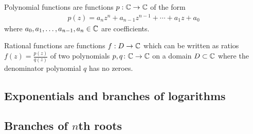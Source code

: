 \begin{definition}[Polynomial]
  \label{def:polynomial}
  Polynomial functions are functions $p : \mathbb{C} \to \mathbb{C}$ of the form
  \begin{align*}
    p(z) = a_n z^n + a_{n-1} z^{n-1} + \cdots + a_1 z + a_0
  \end{align*}
  where $a_0,a_1,\ldots,a_{n-1},a_n \in \mathbb{C}$ are coefficients.
\end{definition}

\begin{definition}
  \label{def:rational_function}
  Rational functions are functions $f : D \to \mathbb{C}$ which can be written as
  ratios $f(z) = \frac{p(z)}{q(z)}$ of two polynomials
  $p, q \colon \mathbb{C} \to \mathbb{C}$ on a domain $D \subset \mathbb{C}$
  where the denominator polynomial $q$ has no zeroes.
\end{definition}



\subsection{Exponentials and branches of logarithms}



\subsection{Branches of $n$th roots}
